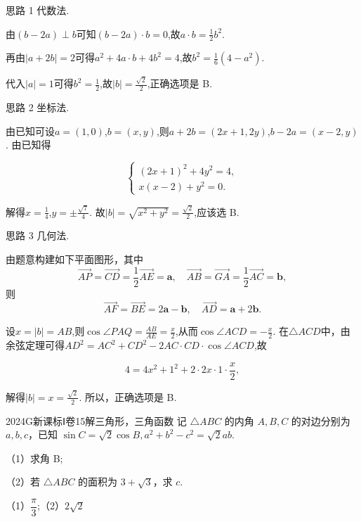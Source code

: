 \documentclass[12pt,UTF-8,a4paper]{ctexart}
\numberwithin{figure}{section}
\theoremstyle{mystyle}
\theoremstyle{mystylekaishu}
\theoremstyle{mystyle}
\numberwithin{xiti}{section}
\begin{document}
\begin{solutions}
思路 1 代数法.

由$(b-2a) \perp b$可知$(b-2a) \cdot b=0$,故$a \cdot b=\frac{1}{2}b^2$.

再由$|a+2b|=2$可得$a^2+4a \cdot b+4b^2=4$,故$b^2=\frac{1}{6}(4-a^2)$.

代入$|a|=1$可得$b^2=\frac{1}{2}$,故$|b|=\frac{\sqrt{2}}{2}$,正确选项是 B.

思路 2 坐标法.

由已知可设$a=(1,0)$,$b=(x,y)$,则$a+2b=(2x+1,2y)$,$b-2a=(x-2,y)$. 由已知得

$$
\begin{cases} (2x+1)^2+4y^2=4, \\ x(x-2)+y^2=0. \end{cases}
$$

解得$x=\frac{1}{4}$,$y=\pm\frac{\sqrt{7}}{4}$. 故$|b|=\sqrt{x^2+y^2}=\frac{\sqrt{2}}{2}$,应该选 B.

思路 3 几何法.

由题意构建如下平面图形，其中
\[
\overrightarrow{AP}=\overrightarrow{CD}=\frac{1}{2}\overrightarrow{AE}=\boldsymbol{a},\quad
\overrightarrow{AB}=\overrightarrow{GA}=\frac{1}{2}\overrightarrow{AC}=\boldsymbol{b},
\]
则
\[
\overrightarrow{AF}=\overrightarrow{BE}=2\boldsymbol{a}-\boldsymbol{b},\quad
\overrightarrow{AD}=\boldsymbol{a}+2\boldsymbol{b}.
\]

设$x=|b|=AB$,则$\cos \angle PAQ=\frac{AB}{AE}=\frac{x}{2}$,从而$\cos \angle ACD=-\frac{x}{2}$. 在$\triangle ACD$中，由余弦定理可得$AD^2=AC^2+CD^2-2AC \cdot CD \cdot \cos \angle ACD$,故

$$
4=4x^2+1^2+2 \cdot 2x \cdot 1 \cdot \frac{x}{2},
$$

解得$|b|=x=\frac{\sqrt{2}}{2}$. 所以，正确选项是 B.
\end{solutions}


\begin{problem}{2024}{G}{新课标Ⅰ卷}{15}{解三角形，三角函数}
记 $\triangle ABC$ 的内角 $A,B,C$ 的对边分别为 $a,b,c$，已知 $\sin C=\sqrt{2}\cos B, a^2+b^2-c^2=\sqrt{2}ab$.

（1）求角 B;

（2）若 $\triangle ABC$ 的面积为 $3+\sqrt{3}$，求 $c$.
\end{problem}

\begin{answer}
（1）$\dfrac{\pi}{3}$;（2）$2\sqrt{2}$
\end{answer}
\end{document}
